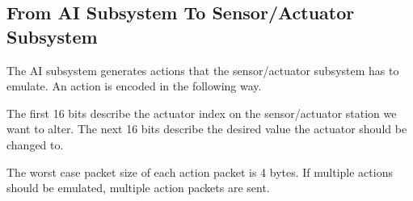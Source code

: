 \subsection{From  AI Subsystem To Sensor/Actuator Subsystem}

The AI subsystem generates actions that the sensor/actuator subsystem has to emulate. An action is encoded in the following way.

The first 16 bits describe the actuator index on the sensor/actuator station we want to alter. The next 16 bits describe the desired value the actuator should be changed to.

The worst case packet size of each action packet is 4 bytes. If multiple actions should be emulated, multiple action packets are sent.
